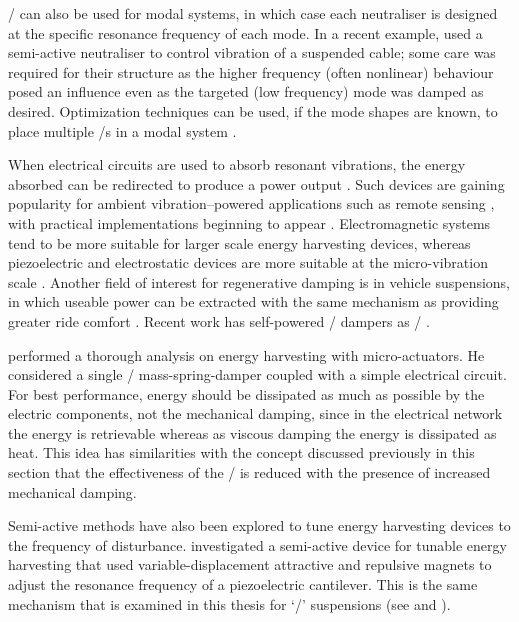 \Vibneut/ can also be used for modal systems, in which case each neutraliser is designed at the specific resonance frequency of each mode.
In a recent example, \textcite{casciati2007} used a semi-active neutraliser to control vibration of a suspended cable; some care was required for their structure as the higher frequency (often nonlinear) behaviour posed an influence even as the targeted (low frequency) mode was damped as desired.
Optimization techniques can be used, if the mode shapes are known, to place multiple \vibneut/s in a modal system \cite{petit2009-jva}.

When electrical circuits are used to absorb resonant vibrations, the energy absorbed can be redirected to produce a power output \cite{stephen2006}.
Such devices are gaining popularity for ambient vibration--powered applications such as remote sensing \cite{arnold2007}, with practical implementations beginning to appear \cite{ferrari2009-sms}.
Electromagnetic systems tend to be more suitable for larger scale energy harvesting devices, whereas piezoelectric and electrostatic devices are more suitable at the micro-vibration scale \cite{beeby2009}.
Another field of interest for regenerative damping is in vehicle suspensions, in which useable power can be extracted with the same mechanism as providing greater ride comfort \cite{graves2000thesis}.
Recent work has self-powered \magnetorh/ dampers as \vibneut/ \cite{choi2009-jva}.

\textcite{stephen2006} performed a thorough analysis on energy harvesting with micro-actuators.
He considered a single \dof/ mass-spring-damper coupled with a simple electrical circuit.
For best performance, energy should be dissipated as much as possible by the electric components, not the mechanical damping, since in the electrical network the energy is retrievable whereas as viscous damping the energy is dissipated as heat.
This idea has similarities with the concept discussed previously in this section that the effectiveness of the \vibneut/ is reduced with the presence of increased mechanical damping.

Semi-active methods have also been explored to tune energy harvesting devices to the frequency of disturbance.
\textcite{challa2008} investigated a semi-active device for tunable energy harvesting that used variable-displacement attractive and repulsive magnets to adjust the resonance frequency of a piezoelectric cantilever.
This is the same mechanism that is examined in this thesis for `\qzs/' suspensions (see  and ).




